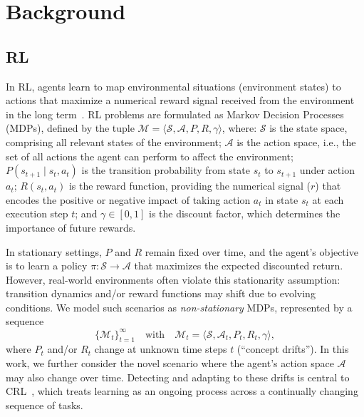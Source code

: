
\section{Background}
\label{sec:background}

\subsection{\acl{RL}}

In \ac{RL}, agents learn to map environmental situations (environment states) to actions that maximize a numerical reward signal received from the environment in the long term~\cite{sutton18}. \ac{RL} problems are formulated as Markov Decision Processes (MDPs), defined by the tuple $\mathcal{M} = \langle \mathcal{S}, \mathcal{A}, P, R, \gamma \rangle$, where:
$\mathcal{S}$ is the state space, comprising all relevant states of the environment;
$\mathcal{A}$ is the action space, i.e., the set of all actions the agent can perform to affect the environment;
$P(s_{t+1} \mid s_t, a_t)$ is the transition probability from state {\color{purple}$s_t$} to {\color{purple}$s_{t+1}$} under action {\color{purple}$a_t$};
$R(s_t, a_t)$ is the reward function, providing the numerical signal ($r$) that encodes the positive or negative impact of taking action {\color{purple}$a_t$} in state {\color{purple}$s_t$} at each execution step $t$; and $\gamma \in [0, 1]$ is the discount factor, which determines the importance of future rewards.

In stationary settings, $P$ and $R$ remain fixed over time, and the agent’s objective is to learn a policy $\pi: \mathcal{S} \to \mathcal{A}$ that maximizes the expected discounted return. However, real-world environments often violate this stationarity assumption: transition dynamics and/or reward functions may shift due to evolving conditions. We model such scenarios as \emph{non-stationary} MDPs, represented by a sequence
\[
\{\mathcal{M}_t\}_{t=1}^\infty
\quad\text{with}\quad
\mathcal{M}_t = \bigl\langle \mathcal{S}, \mathcal{A}_t, P_t, R_t, \gamma \bigr\rangle,
\]
where $P_t$ and/or $R_t$ change at unknown time steps $t$ (``concept drifts''). In this work, we further consider the novel scenario where the agent's action space $\mathcal{A}$ may also change over time. Detecting and adapting to these drifts is central to \ac{CRL}~\cite{khetarpal2022continualreinforcementlearningreview,abel2023definitioncontinualreinforcementlearning}, which treats learning as an ongoing process across a continually changing sequence of tasks.

